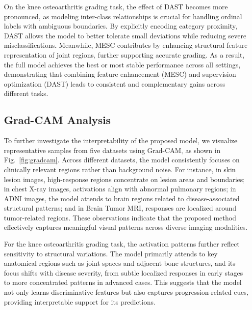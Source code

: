 \documentclass[letterpaper, 10 pt, conference]{ieeeconf}  %
\begin{document}
On the knee osteoarthritis grading task, the effect of DAST becomes more pronounced, as modeling inter-class relationships is crucial for handling ordinal labels with ambiguous boundaries. By explicitly encoding category proximity, DAST allows the model to better tolerate small deviations while reducing severe misclassifications. Meanwhile, MESC contributes by enhancing structural feature representation of joint regions, further supporting accurate grading. As a result, the full model achieves the best or most stable performance across all settings, demonstrating that combining feature enhancement (MESC) and supervision optimization (DAST) leads to consistent and complementary gains across different tasks.

\subsection{Grad-CAM Analysis}

To further investigate the interpretability of the proposed model, we visualize representative samples from five datasets using Grad-CAM, as shown in Fig.~\ref{fig:gradcam}. Across different datasets, the model consistently focuses on clinically relevant regions rather than background noise. For instance, in skin lesion images, high-response regions concentrate on lesion areas and boundaries; in chest X-ray images, activations align with abnormal pulmonary regions; in ADNI images, the model attends to brain regions related to disease-associated structural patterns; and in Brain Tumor MRI, responses are localized around tumor-related regions. These observations indicate that the proposed method effectively captures meaningful visual patterns across diverse imaging modalities.

For the knee osteoarthritis grading task, the activation patterns further reflect sensitivity to structural variations. The model primarily attends to key anatomical regions such as joint spaces and adjacent bone structures, and its focus shifts with disease severity, from subtle localized responses in early stages to more concentrated patterns in advanced cases. This suggests that the model not only learns discriminative features but also captures progression-related cues, providing interpretable support for its predictions.

\end{document}
